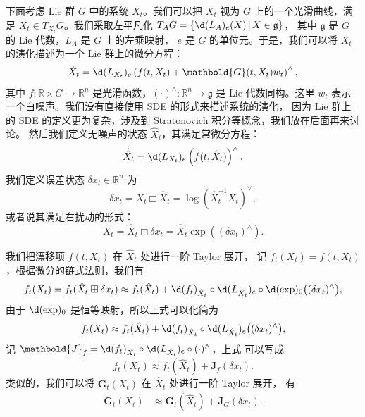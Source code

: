 \documentclass[fontset=none,zihao=-4]{Notes}
\newcommand{\lie}[1]{\mathfrak{#1}}
\newcommand{\mat}[1]{\mathbold{#1}}
\begin{document}
下面考虑 Lie 群 $G$ 中的系统 $X_t$。我们可以把 $X_t$ 视为 $G$
上的一个光滑曲线，满足 $X_t\in T_{X_t}G$。我们采取左平凡化
$T_{A}G=\{\d (L_A)_{e}(X)\,|\, X\in\lie g\}$，
其中 $\lie g$ 是 $G$ 的 Lie 代数，$L_A$ 是 $G$ 上的左乘映射，
$e$ 是 $G$ 的单位元。于是，我们可以将 $X_t$ 的演化描述为一个 Lie 群上的微分方程：
\begin{equation}\label{eq:lie_sde}
  \dot X_t=\d (L_{X_t})_e\left(
    f(t,X_t)+\mat G(t,X_t) w_t
  \right)^\wedge,
\end{equation}
其中 $f:\mathbb{R}\times G\to \mathbb{R}^n$ 是光滑函数，$(\cdot)^\wedge:\mathbb{R}^n\to \lie g$
是 Lie 代数同构。这里 $w_t$ 表示一个白噪声。我们没有直接使用 SDE 的形式来描述系统的演化，
因为 Lie 群上的 SDE 的定义更为复杂，涉及到 Stratonovich 积分等概念，我们放在后面再来讨论。
然后我们定义无噪声的状态 $\hat X_t$，其满足常微分方程：
\[
  \dot{\hat X}_t=\d (L_{X_t})_e\left(
    f(t,\hat X_t)
  \right)^\wedge.
\]
我们定义误差状态 $\delta x_t\in \mathbb{R}^n$ 为
\[
  \delta x_t=X_t\boxminus \hat X_t=\log\left(
    \hat X_t^{-1}X_t
  \right)^\vee,
\]
或者说其满足右扰动的形式：
\[
  X_t=\hat X_t\boxplus \delta x_t=\hat X_t\exp\left(
    (\delta x_t)^\wedge
  \right).
\]

我们把漂移项 $f(t,X_t)$ 在 $\hat X_t$ 处进行一阶 Taylor 展开，
记 $f_t(X_t)=f(t,X_t)$，根据微分的链式法则，我们有
\[
  f_t(X_t)=f_t(\hat X_t\boxplus \delta x_t)
  \approx  f_t(\hat X_t)+ \d (f_t)_{\hat X_t} \circ \d (L_{\hat X_t})_e
  \circ \d (\exp)_0\bigl(
  (\delta x_t)^\wedge\bigr),
\]
由于 $\d(\exp)_0$ 是恒等映射，所以上式可以化简为
\[
  f_t(X_t)\approx f_t(\hat X_t)+ \d (f_t)_{\hat X_t} \circ \d (L_{\hat X_t})_e\bigl(
  (\delta x_t)^\wedge\bigr),
\]
记 $\mat J_f=\d (f_t)_{\hat X_t} \circ \d (L_{\hat X_t})_e\circ (\cdot)^\wedge$，上式
可以写成
\[
  f_t(X_t)\approx f_t(\hat X_t)+ \mat J_f (\delta x_t).
\]
类似的，我们可以将 $\mat G_t(X_t)$ 在 $\hat X_t$ 处进行一阶 Taylor 展开，
有
\begin{align*}
  \mat G_t(X_t)&\approx \mat G_t(\hat X_t)+\mat J_G (\delta x_t).
\end{align*}
\end{document}
